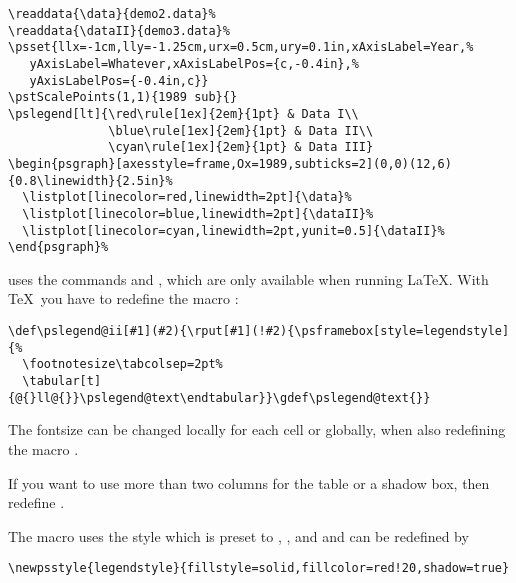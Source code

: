 \documentclass[11pt,english,BCOR10mm,DIV12,bibliography=totoc,parskip=false,smallheadings
    headexclude,footexclude,oneside,dvipsnames,svgnames]{pst-doc}
\begin{document}
\begin{lstlisting}
\readdata{\data}{demo2.data}%
\readdata{\dataII}{demo3.data}%
\psset{llx=-1cm,lly=-1.25cm,urx=0.5cm,ury=0.1in,xAxisLabel=Year,%
   yAxisLabel=Whatever,xAxisLabelPos={c,-0.4in},%
   yAxisLabelPos={-0.4in,c}}
\pstScalePoints(1,1){1989 sub}{}
\pslegend[lt]{\red\rule[1ex]{2em}{1pt} & Data I\\
              \blue\rule[1ex]{2em}{1pt} & Data II\\
              \cyan\rule[1ex]{2em}{1pt} & Data III}
\begin{psgraph}[axesstyle=frame,Ox=1989,subticks=2](0,0)(12,6){0.8\linewidth}{2.5in}%
  \listplot[linecolor=red,linewidth=2pt]{\data}%
  \listplot[linecolor=blue,linewidth=2pt]{\dataII}%
  \listplot[linecolor=cyan,linewidth=2pt,yunit=0.5]{\dataII}%
\end{psgraph}%
\end{lstlisting}

\begin{compactitem}
\item {} uses the commands  and , which are only available
  when running \LaTeX. With \TeX\ you have to redefine the macro :
\begin{lstlisting}
\def\pslegend@ii[#1](#2){\rput[#1](!#2){\psframebox[style=legendstyle]{%
  \footnotesize\tabcolsep=2pt%
  \tabular[t]{@{}ll@{}}\pslegend@text\endtabular}}\gdef\pslegend@text{}}
\end{lstlisting}
\item The fontsize can be changed locally for each cell or globally, when also redefining the
    macro .
\item If you want to use more than two columns for the table or a shadow box, then redefine .
\end{compactitem}

The macro  uses the style  which is preset to ,
, and  and can be redefined by

\begin{lstlisting}
\newpsstyle{legendstyle}{fillstyle=solid,fillcolor=red!20,shadow=true}
\end{lstlisting}
\end{document}
